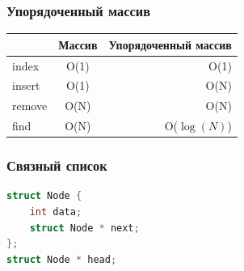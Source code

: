 \documentclass[14pt,pdf,hyperref={unicode}]{beamer}
\begin{document}
\begin{frame}[fragile]
\frametitle{Упорядоченный массив}
\begin{center}
  \begin{tabular}{  l | c r }
      & Массив & Упорядоченный массив \\
    \hline
    index & O(1) & O(1)\\
    insert & O(1) & O(N)\\
    remove & O(N) & O(N)\\
    find & O(N) & O($\log(N)$)\\
    \hline
  \end{tabular}
\end{center}
\end{frame}



\begin{frame}[fragile]
\frametitle{Связный список} 
\begin{lstlisting}[language=C++,basicstyle=\ttfamily,keywordstyle=\color{blue},stringstyle=\color{orange}\ttfamily]
struct Node {
	int data;
	struct Node * next;
};
struct Node * head;
\end{lstlisting}
\end{frame}
\end{document}
